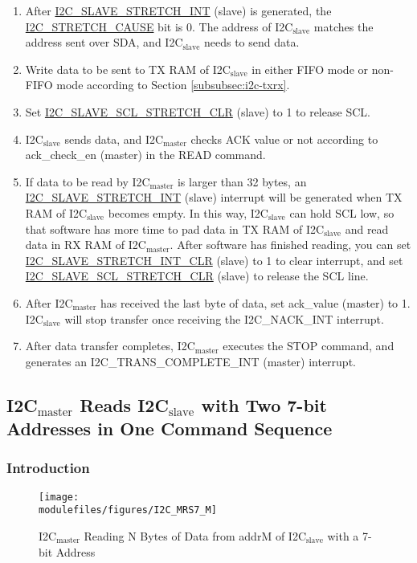 \documentclass[main\_\_EN.tex]{subfiles}
\begin{document}
\begin{enumerate}
\item After \hyperref[int:i2c-slave-stretch]{I2C\_SLAVE\_STRETCH\_INT} (slave) is generated, the \hyperref[fielddesc:I2CSTRETCHCAUSE]{I2C\_STRETCH\_CAUSE} bit is 0. The address of I2C$_\text{slave}$ matches the address sent over SDA, and I2C$_\text{slave}$ needs to send data.
\item Write data to be sent to TX RAM of I2C$_\text{slave}$ in either FIFO mode or non-FIFO mode according to Section \ref{subsubsec:i2c-txrx}.
\item Set \hyperref[fielddesc:I2CSLAVESCLSTRETCHCLR]{I2C\_SLAVE\_SCL\_STRETCH\_CLR} (slave) to 1 to release SCL.


\item I2C$_\text{slave}$ sends data, and I2C$_\text{master}$ checks ACK value or not according to ack\_check\_en (master) in the READ command.
\item If data to be read by I2C$_\text{master}$ is larger than 32 bytes, an \hyperref[int:i2c-slave-stretch]{I2C\_SLAVE\_STRETCH\_INT} (slave) interrupt will be generated when TX RAM of I2C$_\text{slave}$ becomes empty. In this way, I2C$_\text{slave}$ can hold SCL low, so that software has more time to pad data in TX RAM of I2C$_\text{slave}$ and read data in RX RAM of I2C$_\text{master}$. After software has finished reading, you can set \hyperref[fielddesc:I2CSLAVESTRETCHINTCLR]{I2C\_SLAVE\_STRETCH\_INT\_CLR} (slave) to 1 to clear interrupt, and set \hyperref[fielddesc:I2CSLAVESCLSTRETCHCLR]{I2C\_SLAVE\_SCL\_STRETCH\_CLR} (slave) to release the SCL line.
\item After I2C$_\text{master}$ has received the last byte of data, set ack\_value (master) to 1. I2C$_\text{slave}$ will stop transfer once receiving the I2C\_NACK\_INT interrupt.

\item After data transfer completes, I2C$_\text{master}$ executes the STOP command, and generates an I2C\_TRANS\_COMPLETE\_INT (master) interrupt.
\end{enumerate}

\subsection{\texorpdfstring{I2C$_\text{master}$ Reads I2C$_\text{slave}$ with Two 7-bit Addresses in One Command Sequence}{I2C master Reads I2C slave with Two 7-bit Addresses in One Command Sequence}}
\subsubsection{Introduction}
\begin{figure}[H]
    \centering
    \texttt{[image: \\modulefiles/figures/I2C\_MRS7\_M]}
    \caption{I2C$_\text{master}$ Reading N Bytes of Data from addrM of I2C$_\text{slave}$ with a 7-bit Address}
    \label{fig:i2c-mrs7-m}
\end{figure}
\end{document}
